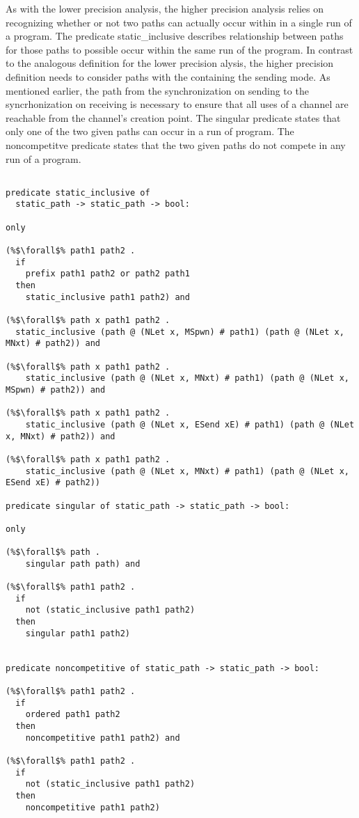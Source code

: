 \documentclass{article}
\begin{document}
As with the lower precision analysis, the higher precision analysis relies on recognizing
whether or not two paths can actually occur within in a single run of a program.  The predicate
static\_inclusive describes relationship between paths for those paths to possible occur within
the same run of the program.  In contrast to the analogous definition for the lower precision
alysis, the higher precision definition needs to consider paths with the containing the
sending mode.  As mentioned earlier, the path from the synchronization on sending to the
syncrhonization on receiving is necessary to ensure that all uses of a channel are reachable
from the channel's creation point.  The singular predicate states that only one of the two
given paths can occur in a run of program.  The noncompetitve predicate states that the two
given paths do not compete in any run of a program. 


\begin{lstlisting}[language=logic, style=codestyle1, escapechar=\%]

predicate static_inclusive of
  static_path -> static_path -> bool:

only

(%$\forall$% path1 path2 .
  if
    prefix path1 path2 or path2 path1
  then
    static_inclusive path1 path2) and

(%$\forall$% path x path1 path2 .
  static_inclusive (path @ (NLet x, MSpwn) # path1) (path @ (NLet x, MNxt) # path2)) and

(%$\forall$% path x path1 path2 .
    static_inclusive (path @ (NLet x, MNxt) # path1) (path @ (NLet x, MSpwn) # path2)) and

(%$\forall$% path x path1 path2 .
    static_inclusive (path @ (NLet x, ESend xE) # path1) (path @ (NLet x, MNxt) # path2)) and

(%$\forall$% path x path1 path2 .
    static_inclusive (path @ (NLet x, MNxt) # path1) (path @ (NLet x, ESend xE) # path2))

predicate singular of static_path -> static_path -> bool:

only 

(%$\forall$% path .
    singular path path) and

(%$\forall$% path1 path2 .
  if
    not (static_inclusive path1 path2)
  then
    singular path1 path2)


predicate noncompetitive of static_path -> static_path -> bool:

(%$\forall$% path1 path2 . 
  if
    ordered path1 path2
  then
    noncompetitive path1 path2) and

(%$\forall$% path1 path2 .
  if
    not (static_inclusive path1 path2)
  then
    noncompetitive path1 path2)
  \end{lstlisting}
\end{document}
